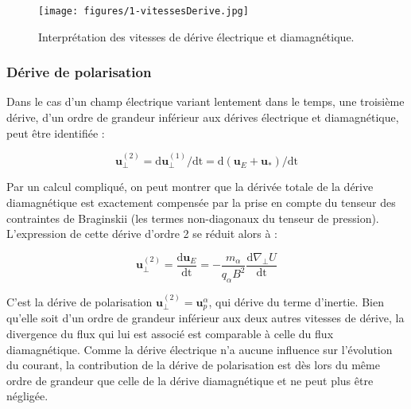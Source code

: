 \begin{refsection}
\begin{figure}[!htbp]
    \centering
	\texttt{[image: figures/1-vitessesDerive.jpg]}
	\caption{Interprétation des vitesses de dérive électrique et diamagnétique.}
	\label{1-vitessesDerive}
\end{figure}


\subsubsection{Dérive de polarisation}

Dans le cas d'un champ électrique variant lentement dans le temps, une troisième
dérive, d'un ordre de grandeur inférieur aux dérives électrique et diamagnétique,
peut être identifiée : 

\begin{equation}
\label{1-vitessePol}
\mathbf{u}_\perp^{(2)}= \text{d}\mathbf
u_\perp^{(1)}/\text{dt}=\text{d}(\mathbf
u_E+\mathbf
u_*)/\text{dt}
\end{equation}

Par un calcul compliqué, on peut montrer que la dérivée totale de la dérive
diamagnétique est exactement compensée par la prise en compte du tenseur des
contraintes de Braginskii (les termes non-diagonaux du tenseur de
pression). L'expression de cette dérive d'ordre 2 se réduit alors à :

\begin{equation}
\label{1-vitessePol}
\mathbf{u}_\perp^{(2)}= \frac{\text{d}\mathbf
u_E}{\text{dt}}=-\frac{m_\alpha}{q_\alpha B^2}\frac{\text{d}\nabla_\perp
U}{\text{dt}}
\end{equation}

C'est la dérive de polarisation $\mathbf{u}_\perp^{(2)}=\mathbf u^\alpha_p$, qui
dérive du terme d'inertie. Bien qu'elle soit d'un ordre de grandeur inférieur aux deux autres
vitesses de dérive, la divergence du flux qui lui est associé est comparable à celle du
flux diamagnétique. Comme la dérive électrique n'a aucune influence sur
l'évolution du courant, la contribution de la dérive de polarisation est dès
lors du même ordre de grandeur que celle de la dérive diamagnétique et ne peut plus
être négligée.


\end{refsection}
